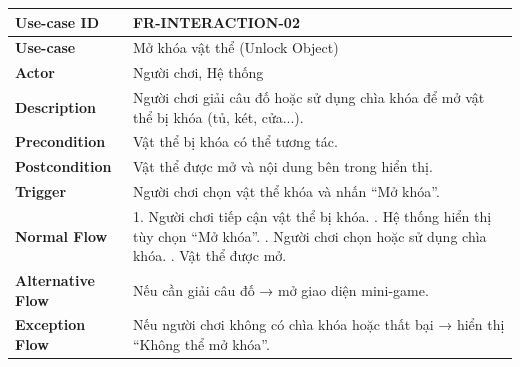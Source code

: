 \begin{table}[H]
\centering
\begin{tabular}{|p{4cm}|p{10cm}|}
\hline
\textbf{Use-case ID} & FR-INTERACTION-02 \\ \hline
\textbf{Use-case} & Mở khóa vật thể (Unlock Object) \\ \hline
\textbf{Actor} & Người chơi, Hệ thống \\ \hline
\textbf{Description} & Người chơi giải câu đố hoặc sử dụng chìa khóa để mở vật thể bị khóa (tủ, két, cửa...). \\ \hline
\textbf{Precondition} & Vật thể bị khóa có thể tương tác. \\ \hline
\textbf{Postcondition} & Vật thể được mở và nội dung bên trong hiển thị. \\ \hline
\textbf{Trigger} & Người chơi chọn vật thể khóa và nhấn “Mở khóa”. \\ \hline
\textbf{Normal Flow} &
1. Người chơi tiếp cận vật thể bị khóa. \newline
2. Hệ thống hiển thị tùy chọn “Mở khóa”. \newline
3. Người chơi chọn hoặc sử dụng chìa khóa. \newline
4. Vật thể được mở. \\ \hline
\textbf{Alternative Flow} &
Nếu cần giải câu đố → mở giao diện mini-game. \\ \hline
\textbf{Exception Flow} &
Nếu người chơi không có chìa khóa hoặc thất bại → hiển thị “Không thể mở khóa”. \\ \hline
\end{tabular}
\end{table}


